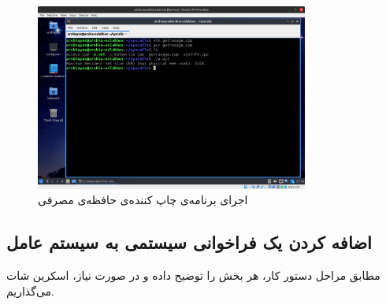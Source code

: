 \documentclass[12pt]{article}
\begin{document}
\begin{itemize}
        \begin{figure}[H]
		\centering
		\includegraphics[width=0.8\textwidth]{report2-resources/14.png}
		\caption{اجرای برنامه‌ی چاپ کننده‌ی حافظه‌ی مصرفی}
	\end{figure}
       
        \end{itemize}

        \subsection{اضافه کردن یک فراخوانی سیستمی به سیستم عامل}
        مطابق مراحل دستور کار، هر بخش را توضیح داده و در صورت نیاز، اسکرین شات می‌گذاریم.
\end{document}
